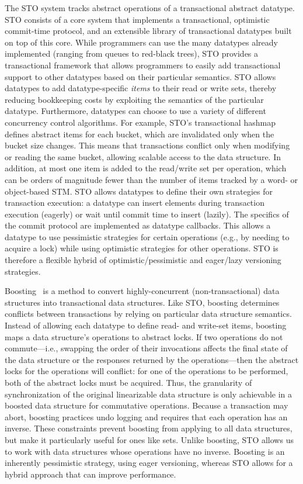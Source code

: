 The STO system tracks abstract operations of a transactional abstract datatype. STO consists of a core system that implements a transactional, optimistic commit-time protocol, and an extensible library of transactional datatypes built on top of this core. While programmers can use the many datatypes already implemented (ranging from queues to red-black trees), STO provides a transactional framework that allows programmers to easily add transactional support to other datatypes based on their particular semantics. STO allows datatypes to add datatype-specific \emph{items} to their read or write sets, thereby reducing bookkeeping costs by 
exploiting the semantics of the particular datatype. Furthermore, datatypes can choose to use a variety of different concurrency control algorithms. For example, STO's transactional hashmap defines abstract items for each bucket, which are invalidated only when the bucket size changes. This means that transactions conflict only when modifying or reading the same bucket, allowing scalable access to the data structure. In addition, at most one item is added to the read/write set per operation, which can be orders of magnitude fewer than the number of items tracked by a word- or object-based STM. STO allows datatypes to define their own strategies for transaction execution: a datatype can insert elements during transaction execution (eagerly) or wait until commit time to insert (lazily). The specifics of the commit protocol are implemented as datatype callbacks. This allows a datatype to use pessimistic strategies for certain operations (e.g., by needing to acquire a lock) while using optimistic strategies for other operations. STO is therefore a flexible hybrid of optimistic/pessimistic and eager/lazy versioning strategies.

Boosting~\cite{boost} is a method to convert highly-concurrent (non-transactional) data structures into transactional data structures. Like STO, boosting determines conflicts between transactions by relying on particular data structure semantics. Instead of allowing each datatype to define read- and write-set items, boosting maps a data structure's operations to abstract locks. If two operations do not commute---i.e., swapping the order of their invocations affects the final state of the data structure or the responses returned by the operations---then the abstract locks for the operations will conflict: for one of the operations to be performed, both of the abstract locks must be acquired. Thus, the granularity of synchronization of the original linearizable data structure is only achievable in a boosted data structure for commutative operations. Because a transaction may abort, boosting practices undo logging and requires that each operation has an inverse. These constraints prevent boosting from applying to all data structures, but make it particularly useful for ones like sets. Unlike boosting, STO allows us to work with data structures whose operations have no inverse. Boosting is an inherently pessimistic strategy, using eager versioning, whereas STO allows for a hybrid approach that can improve performance.

